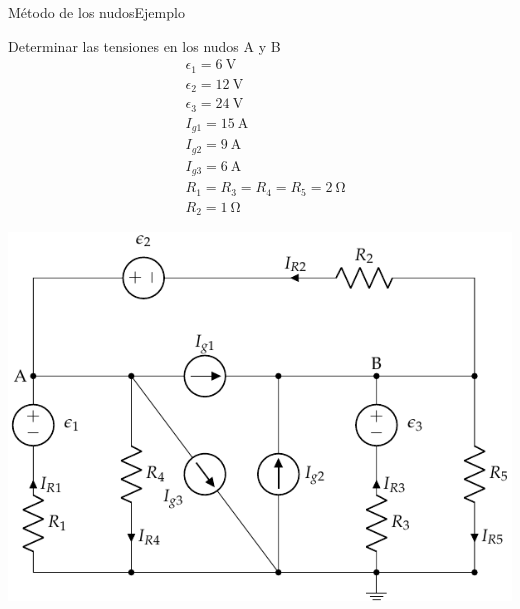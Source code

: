 \documentclass[aspectratio=169, xcolor={usenames,svgnames,dvipsnames}]{beamer}
\begin{document}
\begin{frame}{Método de los nudos}{Ejemplo}
\begin{minipage}[c]{0.5\linewidth}
Determinar las tensiones en los nudos A y B
\begin{align*}
    &\epsilon_1=\qty{6}{\volt}\\
    &\epsilon_2=\qty{12}{\volt} \\
    &\epsilon_3=\qty{24}{\volt}\\
    &I_{g1}= \qty{15}{\ampere}\\
    &I_{g2} =\qty{9}{\ampere}\\
    &I_{g3}= \qty{6}{\ampere}\\
    &R_{1}= R_3 = R_4 = R_5 = \qty{2}{\ohm}\\
    &R_{2}= \qty{1}{\ohm}
\end{align*}
\end{minipage}
\hfill
\begin{minipage}[c]{0.485\linewidth}
\begin{center}
    \includegraphics[width=\linewidth]{../figs/nudos_fuentes.pdf}
\end{center}
\end{minipage}
\end{frame}
\end{document}
